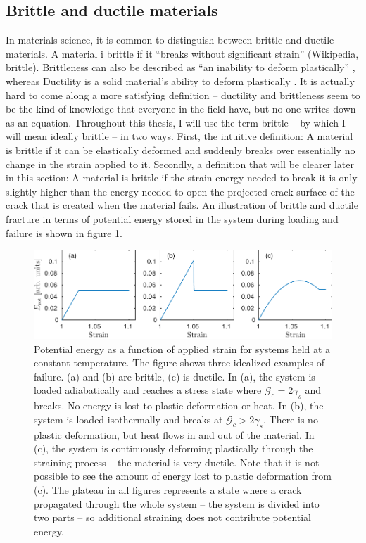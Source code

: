 \subsection{Brittle and ductile materials}
In materials science, it is common to distinguish between brittle and ductile materials. A material i brittle if it ``breaks without significant strain'' (Wikipedia, brittle). Brittleness can also be described as ``an inability to deform plastically'' \cite{benham1996mechanics}, whereas Ductility is a solid material's ability to deform plastically \cite{benham1996mechanics}. It is actually hard to come along a more satisfying definition -- ductility and brittleness seem to be the kind of knowledge that everyone in the field have, but no one writes down as an equation. Throughout this thesis, I will use the term brittle -- by which I will mean ideally brittle -- in two ways. First, the intuitive definition: A material is brittle if it can be elastically deformed and suddenly breaks over essentially no change in the strain applied to it. Secondly, a definition that will be clearer later in this section: A material is brittle if the strain energy needed to break it is only slightly higher than the energy needed to open the projected crack surface of the crack that is created when the material fails. An illustration of brittle and ductile fracture in terms of potential energy stored in the system during loading and failure is shown in figure \ref{fig:idealized_fracture}.

\begin{figure}
\centering
\includegraphics[width=\textwidth]{../figures/thesis/idealized_fracture_e_pot.pdf}
\caption{Potential energy as a function of applied strain for systems held at a constant temperature. The figure shows three idealized examples of failure. (a) and (b) are brittle, (c) is ductile. In (a), the system is loaded adiabatically and reaches a stress state where $\mathcal{G}_c = 2\gamma_s$ and breaks. No energy is lost to plastic deformation or heat. In (b), the system is loaded isothermally and breaks at $\mathcal{G}_c > 2\gamma_s$. There is no plastic deformation, but heat flows in and out of the material. In (c), the system is continuously deforming plastically through the straining process -- the material is very ductile. Note that it is not possible to see the amount of energy lost to plastic deformation from (c). The plateau in all figures represents a state where a crack propagated through the whole system -- the system is divided into two parts -- so additional straining does not contribute potential energy. }
\label{fig:idealized_fracture}
\end{figure}

